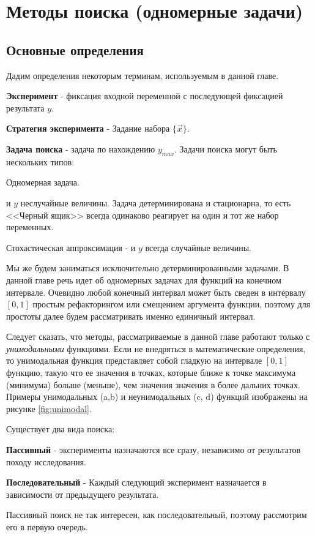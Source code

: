 \chapter{Методы поиска (одномерные задачи)}
\section{Основные определения}
Дадим определения некоторым терминам, используемым в данной главе.

\textbf{Эксперимент} - фиксация входной переменной \vx { } с последующей фиксацией результата $y$.

\textbf{Стратегия эксперимента} - Задание набора $\{\vec{x}\}$.

\textbf{Задача поиска} - задача по нахождению $y_{max}$.
Задачи поиска могут быть нескольких типов:
\bi
\item Одномерная задача.
\item \vx { } и $y$ неслучайные величины. Задача детерминирована и стационарна, то есть <<Черный ящик>> всегда одинаково реагирует на один и тот же набор переменных.
\item Стохастическая аппроксимация - \vx { } и $y$ всегда случайные величины.
\ei

Мы же будем заниматься исключительно детерминированными задачами. В данной главе речь идет об одномерных задачах для функций на конечном интервале. Очевидно любой конечный интервал может быть сведен в интервалу $[0, 1]$ простым рефакторингом или смещением аргумента функции, поэтому для простоты далее будем рассматривать именно единичный интервал.

Следует сказать, что методы, рассматриваемые в данной главе работают только с \textit{унимодальными} функциями. Если не внедряться в математические определения, то унимодальная функция представляет собой гладкую на интервале $[0, 1]$ функцию, такую что ее значения в точках, которые ближе к точке максимума (минимума) больше (меньше), чем значения значения в более дальних точках. Примеры унимодальных (a,b) и неунимодальных (c, d) функций изображены на рисунке \ref{fig:unimodal}.

Существует два вида поиска:

\textbf{Пассивный} - эксперименты назначаются все сразу, независимо от результатов походу исследования.

\textbf{Последовательный} - Каждый следующий эксперимент назначается в зависимости от предыдущего результата.

Пассивный поиск не так интересен, как последовательный, поэтому рассмотрим его в первую очередь.
